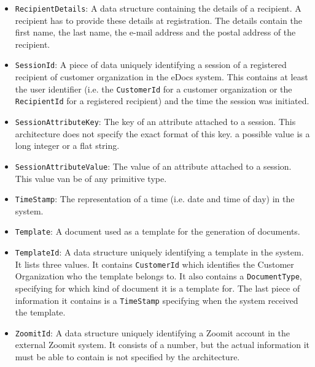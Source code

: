 \documentclass[a4paper,10pt]{article}
\begin{document}
\begin{itemize}
    \item \texttt{RecipientDetails}: A data structure containing the details of a recipient. A recipient has to provide these details at registration. The details contain the first name, the last name, the e-mail address and the postal address of the recipient.
    
    \item \texttt{SessionId}: A piece of data uniquely identifying a session of a registered recipient of customer organization in the eDocs system. This contains at least the user identifier (i.e. the \texttt{CustomerId} for a customer organization or the \texttt{RecipientId} for a registered recipient) and the time the session was initiated.
    
    \item \texttt{SessionAttributeKey}: The key of an attribute attached to a session. This architecture does not specify the exact format of this key. a possible value is a long integer or a flat string.
    
    \item \texttt{SessionAttributeValue}: The value of an attribute attached to a session. This value van be of any primitive type.
    
    \item \texttt{TimeStamp}: The representation of a time (i.e. date and time of day) in the system.
    
    \item \texttt{Template}: A document used as a template for the generation of documents.
    
    \item \texttt{TemplateId}: A data structure uniquely identifying a template in the system. It lists three values. It contains \texttt{CustomerId} which identifies the Customer Organization who the template belongs to. It also contains a \texttt{DocumentType}, specifying for which kind of document it is a template for. The last piece of information it contains is a \texttt{TimeStamp} specifying when the system received the template.
    
    \item \texttt{ZoomitId}: A data structure uniquely identifying a Zoomit account in the external Zoomit system. It consists of a number, but the actual information it must be able to contain is not specified by the architecture. 
\end{itemize}
\end{document}
